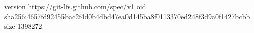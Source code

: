 version https://git-lfs.github.com/spec/v1
oid sha256:4657fd92455bac2f4d0b4dbd47ea0d145ba8f0113370ed248f3d9a0f1427bcbb
size 1398272
